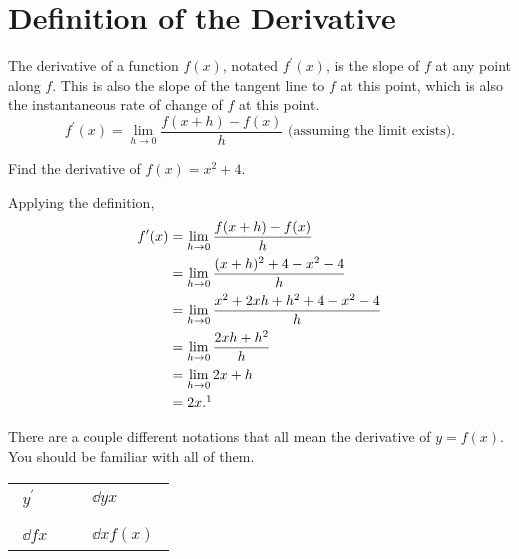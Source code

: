 \section{Definition of the Derivative}
\begin{definition}
	The derivative of a function $f(x)$, notated $f^\prime(x)$, is the slope of $f$ at any point along $f$.
	This is also the slope of the tangent line to $f$ at this point, which is also the instantaneous rate of change of $f$ at this point.
	\begin{equation}
		f^\prime(x) = \lim_{h \to 0}{\frac{f(x+h)-f(x)}{h}} \text{ (assuming the limit exists).}
	\end{equation}
\end{definition}

\begin{example}
	Find the derivative of $f(x)=x^2+4$.
\end{example}
\begin{answer}
	Applying the definition,
	\begin{align*}
		f^\prime(x) &= \lim_{h\to 0}{\frac{f(x+h)-f(x)}{h}} \\
		&= \lim_{h \to 0}{\frac{(x+h)^2+4 - x^2 - 4}{h}} \\
		&= \lim_{h \to 0}{\frac{x^2 + 2xh + h^2 + 4 - x^2 - 4}{h}} \\
		&= \lim_{h \to 0}{\frac{2xh + h^2}{h}} \\
		&= \lim_{h\to 0}{2x + h} \\
		&= 2x.\footnotemark
	\end{align*}
\end{answer}


There are a couple different notations that all mean the derivative of $y = f(x)$.
You should be familiar with all of them.
\begin{table}[H]
\begin{center}
\begin{tabular}{ l l l }
	$\begin{aligned}y^\prime\end{aligned}$ & & $\begin{aligned}\dd{y}{x}\end{aligned}$ \\
	& & \\
	$\begin{aligned}\dd{f}{x}\end{aligned}$ & & $\begin{aligned}\dd{}{x}f(x)\end{aligned}$
\end{tabular}
\end{center}
\end{table}

